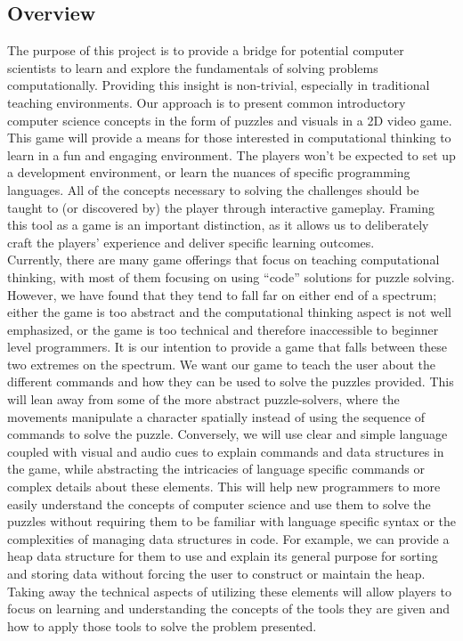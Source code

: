 \subsection{Overview}
The purpose of this project is to provide a bridge for potential computer
scientists to learn and explore the fundamentals of solving problems
computationally. Providing this insight is non-trivial, especially in
traditional teaching environments. Our approach is to present common
introductory computer science concepts in the form of puzzles and visuals in a
2D video game. This game will provide a means for those interested in
computational thinking to learn in a fun and engaging environment. The players
won’t be expected to set up a development environment, or learn the nuances of
specific programming languages. All of the concepts necessary to solving the
challenges should be taught to (or discovered by) the player through interactive
gameplay. Framing this tool as a game is an important distinction, as it allows
us to deliberately craft the players’ experience and deliver specific learning
outcomes.\\

Currently, there are many game offerings that focus on teaching computational
thinking, with most of them focusing on using “code” solutions for puzzle
solving. However, we have found that they tend to fall far on either end of a
spectrum; either the game is too abstract and the computational thinking aspect
is not well emphasized, or the game is too technical and therefore inaccessible
to beginner level programmers. It is our intention to provide a game that falls
between these two extremes on the spectrum. We want our game to teach the user
about the different commands and how they can be used to solve the puzzles
provided. This will lean away from some of the more abstract puzzle-solvers,
where the movements manipulate a character spatially instead of using the
sequence of commands to solve the puzzle. Conversely, we will use clear and
simple language coupled with visual and audio cues to explain commands and data
structures in the game, while abstracting the intricacies of language specific
commands or complex details about these elements. This will help new programmers
to more easily understand the concepts of computer science and use them to solve
the puzzles without requiring them to be familiar with language specific syntax
or the complexities of managing data structures in code. For example, we can
provide a heap data structure for them to use and explain its general purpose
for sorting and storing data without forcing the user to construct or maintain
the heap. Taking away the technical aspects of utilizing these elements will
allow players to focus on learning and understanding the concepts of the tools 
they are given and how to apply those tools to solve the problem presented.


